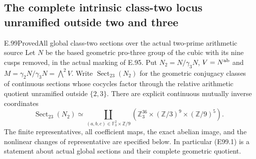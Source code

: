 \subsection{The complete intrinsic class-two locus unramified outside two and three}

\begin{statement}{E.99}{Proved}{All global class-two sections over the actual two-prime arithmetic source}
Let $N$ be the based geometric pro-three group of the cubic
with its nine cusps removed, in the actual marking of E.95.
Put $N_2=N/\gamma_3N$, $V=N^{\rm ab}$ and
$M=\gamma_2N/\gamma_3N=\bigwedge^2V$.
Write $\operatorname{Sect}_{23}(N_2)$ for the geometric
conjugacy classes of continuous sections whose cocycles
factor through the relative arithmetic quotient unramified
outside $\{2,3\}$.
There are explicit continuous mutually inverse coordinates
\[
 \boxed{\quad
 \operatorname{Sect}_{23}(N_2)
 \simeq\coprod_{(a,b,c)\in\mathbb F_3^2\times\mathbb Z/9}
 \left(\mathbb Z_3^{36}\times
       (\mathbb Z/3)^9\times(\mathbb Z/9)^5\right).
 \quad}                                                    \tag{E99.1}
\]
The finite representatives, all coefficient maps, the exact
abelian image, and the nonlinear changes of representative
are specified below. In particular (E99.1) is a statement
about actual global sections and their complete geometric
quotient.


\end{statement}
